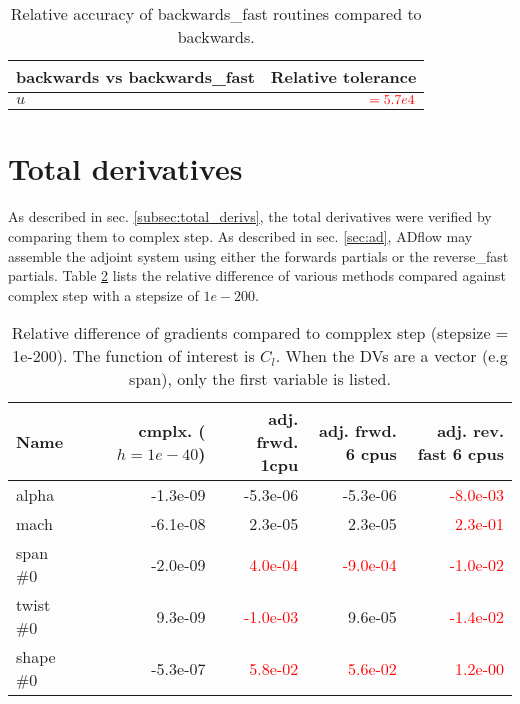 \begin{table}[H]
    \centering
    \begin{tabular}{l r}
        \toprule
        backwards vs backwards\_fast        & Relative tolerance \\
        \toprule
        $u$                                 & $\textcolor{red}{= 5.7e4}$ \\
        \bottomrule
    \end{tabular}
    \caption{Relative accuracy of backwards\_fast routines compared to
    backwards.}
    \label{tab:partials_fast}
\end{table}







\section{Total derivatives}
\label{sec:total_derivs}
As described in sec. \ref{subsec:total_derivs}, the total derivatives were
verified by comparing them to complex step. As described in sec. \ref{sec:ad},
ADflow may assemble the adjoint system using either the forwards partials or
the reverse\_fast partials. Table \ref{tab:total_derivs} lists the relative
difference of various methods compared against complex step with a stepsize of
$1e-200$.

\begin{table}[H]
    \centering
    \begin{tabular}{l r r r r}
        \toprule
        Name        & cmplx. ($h=1e-40$)   & adj. frwd. 1cpu           & 
            adj. frwd. 6 cpus         & adj. rev. fast 6 cpus    \\
        \toprule
        alpha       & -1.3e-09             & -5.3e-06                  & 
            -5.3e-06                  & \textcolor{red}{-8.0e-03} \\
        mach        & -6.1e-08             &  2.3e-05                  &  
            2.3e-05                  & \textcolor{red}{ 2.3e-01} \\
        \midrule
        span \#0    & -2.0e-09             &\textcolor{red}{ 4.0e-04}  &
            \textcolor{red}{-9.0e-04}  & \textcolor{red}{-1.0e-02} \\        
        twist \#0   &  9.3e-09             &\textcolor{red}{-1.0e-03}  &
            9.6e-05                    & \textcolor{red}{-1.4e-02} \\        
        shape \#0   & -5.3e-07             &\textcolor{red}{ 5.8e-02}  &
            \textcolor{red}{ 5.6e-02}  & \textcolor{red}{ 1.2e-00} \\         
        \bottomrule
    \end{tabular}
    \caption{Relative difference of gradients compared to compplex step
    (stepsize = 1e-200). The function of interest is $C_l$. When the DVs are a
    vector (e.g span), only the first variable is listed.}
    \label{tab:total_derivs}
\end{table}

